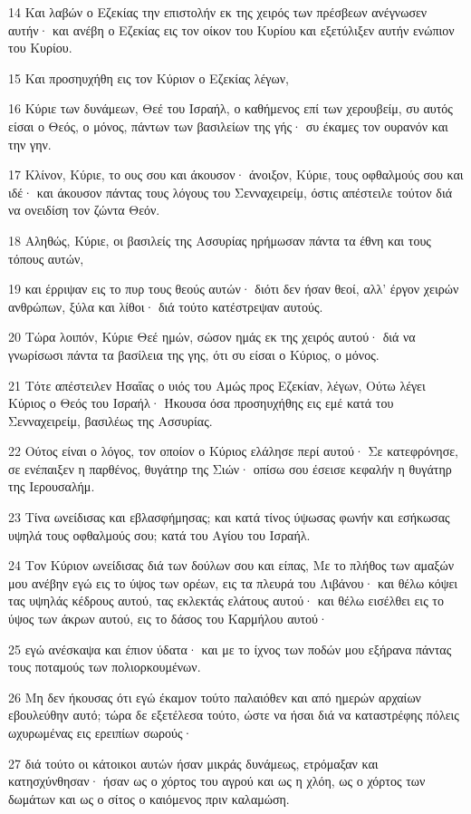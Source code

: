\par 14 Και λαβών ο Εζεκίας την επιστολήν εκ της χειρός των πρέσβεων ανέγνωσεν αυτήν· και ανέβη ο Εζεκίας εις τον οίκον του Κυρίου και εξετύλιξεν αυτήν ενώπιον του Κυρίου.
\par 15 Και προσηυχήθη εις τον Κύριον ο Εζεκίας λέγων,
\par 16 Κύριε των δυνάμεων, Θεέ του Ισραήλ, ο καθήμενος επί των χερουβείμ, συ αυτός είσαι ο Θεός, ο μόνος, πάντων των βασιλείων της γής· συ έκαμες τον ουρανόν και την γην.
\par 17 Κλίνον, Κύριε, το ους σου και άκουσον· άνοιξον, Κύριε, τους οφθαλμούς σου και ιδέ· και άκουσον πάντας τους λόγους του Σενναχειρείμ, όστις απέστειλε τούτον διά να ονειδίση τον ζώντα Θεόν.
\par 18 Αληθώς, Κύριε, οι βασιλείς της Ασσυρίας ηρήμωσαν πάντα τα έθνη και τους τόπους αυτών,
\par 19 και έρριψαν εις το πυρ τους θεούς αυτών· διότι δεν ήσαν θεοί, αλλ' έργον χειρών ανθρώπων, ξύλα και λίθοι· διά τούτο κατέστρεψαν αυτούς.
\par 20 Τώρα λοιπόν, Κύριε Θεέ ημών, σώσον ημάς εκ της χειρός αυτού· διά να γνωρίσωσι πάντα τα βασίλεια της γης, ότι συ είσαι ο Κύριος, ο μόνος.
\par 21 Τότε απέστειλεν Ησαΐας ο υιός του Αμώς προς Εζεκίαν, λέγων, Ούτω λέγει Κύριος ο Θεός του Ισραήλ· Ήκουσα όσα προσηυχήθης εις εμέ κατά του Σενναχειρείμ, βασιλέως της Ασσυρίας.
\par 22 Ούτος είναι ο λόγος, τον οποίον ο Κύριος ελάλησε περί αυτού· Σε κατεφρόνησε, σε ενέπαιξεν η παρθένος, θυγάτηρ της Σιών· οπίσω σου έσεισε κεφαλήν η θυγάτηρ της Ιερουσαλήμ.
\par 23 Τίνα ωνείδισας και εβλασφήμησας; και κατά τίνος ύψωσας φωνήν και εσήκωσας υψηλά τους οφθαλμούς σου; κατά του Αγίου του Ισραήλ.
\par 24 Τον Κύριον ωνείδισας διά των δούλων σου και είπας, Με το πλήθος των αμαξών μου ανέβην εγώ εις το ύψος των ορέων, εις τα πλευρά του Λιβάνου· και θέλω κόψει τας υψηλάς κέδρους αυτού, τας εκλεκτάς ελάτους αυτού· και θέλω εισέλθει εις το ύψος των άκρων αυτού, εις το δάσος του Καρμήλου αυτού·
\par 25 εγώ ανέσκαψα και έπιον ύδατα· και με το ίχνος των ποδών μου εξήρανα πάντας τους ποταμούς των πολιορκουμένων.
\par 26 Μη δεν ήκουσας ότι εγώ έκαμον τούτο παλαιόθεν και από ημερών αρχαίων εβουλεύθην αυτό; τώρα δε εξετέλεσα τούτο, ώστε να ήσαι διά να καταστρέφης πόλεις ωχυρωμένας εις ερειπίων σωρούς·
\par 27 διά τούτο οι κάτοικοι αυτών ήσαν μικράς δυνάμεως, ετρόμαξαν και κατησχύνθησαν· ήσαν ως ο χόρτος του αγρού και ως η χλόη, ως ο χόρτος των δωμάτων και ως ο σίτος ο καιόμενος πριν καλαμώση.
